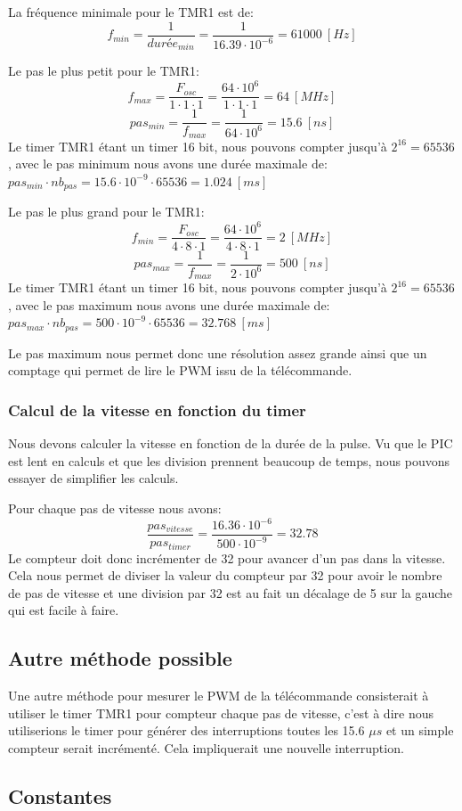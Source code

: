 \documentclass[fleqn, 11pt, a4paper]{article}
\begin{document}
  La fréquence minimale pour le TMR1 est de:
  $$f_{min} = \frac{1}{durée_{min}} = \frac{1}{16.39 \cdot 10^{-6}} = 61000\ [Hz]$$
  
  Le pas le plus petit pour le TMR1:
  $$f_{max} = \frac{F_{osc}}{1 \cdot 1 \cdot 1} = \frac{64 \cdot 10^{6}}{1 \cdot 1 \cdot 1} = 64\ [MHz]$$
  $$pas_{min} = \frac{1}{f_{max}}= \frac{1}{64 \cdot 10^{6}} = 15.6\ [ns]$$
  Le timer TMR1 étant un timer 16 bit, nous pouvons compter jusqu'à $2^{16} = 65536$, avec le pas minimum nous avons une durée maximale de: $pas_{min} \cdot nb_{pas} = 15.6 \cdot 10^{-9} \cdot 65536 = 1.024\ [ms]$
  
  Le pas le plus grand pour le TMR1:
    $$f_{min} = \frac{F_{osc}}{4 \cdot 8 \cdot 1} = \frac{64 \cdot 10^{6}}{4 \cdot 8 \cdot 1} = 2\ [MHz]$$
  $$pas_{max} = \frac{1}{f_{max}}= \frac{1}{2 \cdot 10^{6}} = 500\ [ns]$$
    Le timer TMR1 étant un timer 16 bit, nous pouvons compter jusqu'à $2^{16} = 65536$, avec le pas maximum nous avons une durée maximale de: $pas_{max} \cdot nb_{pas} = 500 \cdot 10^{-9} \cdot 65536 = 32.768\ [ms]$
    
    Le pas maximum nous permet donc une résolution assez grande ainsi que un comptage qui permet de lire le PWM issu de la télécommande.
    
    \subsubsection{Calcul de la vitesse en fonction du timer}
    Nous devons calculer la vitesse en fonction de la durée de la pulse.
    Vu que le PIC est lent en calculs et que les division prennent beaucoup de temps, nous pouvons essayer de simplifier les calculs.
    
    Pour chaque pas de vitesse nous avons:
    $$\frac{pas_{vitesse}}{pas_{timer}} =  \frac{16.36 \cdot 10^{-6}}{500 \cdot 10^{-9}}=32.78$$
    Le compteur doit donc incrémenter de 32 pour avancer d'un pas dans la vitesse. Cela nous permet de diviser la valeur du compteur par 32 pour avoir le nombre de pas de vitesse et une division par 32 est au fait un décalage de 5 sur la gauche qui est facile à faire.
    
    \subsection{Autre méthode possible}
    Une autre méthode pour mesurer le PWM de la télécommande consisterait à utiliser le timer TMR1 pour compteur chaque pas de vitesse, c'est à dire nous utiliserions le timer pour générer des interruptions toutes les 15.6 $\mu s$ et un simple compteur serait incrémenté. Cela impliquerait une nouvelle interruption.
    
  
  
	\newpage
	\begin{appendix}
	\section{Constantes}

	
	\end{appendix}
	
	
\end{document}
